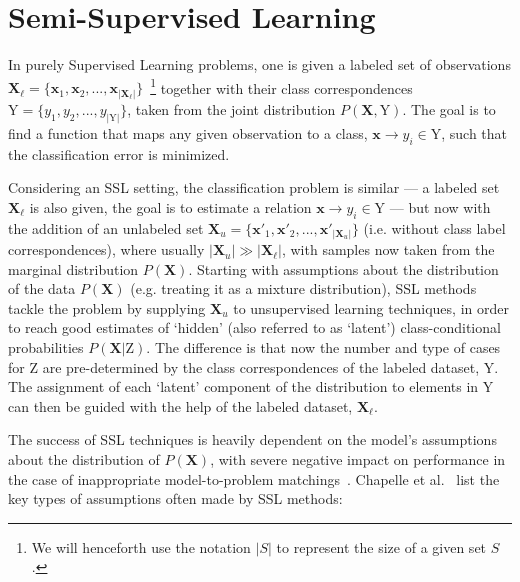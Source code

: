 \section{Semi-Supervised Learning}
\label{subsec:semi-supervised}


In purely Supervised Learning problems, one is given a labeled set of observations $\textbf{X}_\ell = \{\textbf{x}_1, \textbf{x}_2, ..., \textbf{x}_{|\textbf{X}_\ell|}\}$~\footnote{We will henceforth use the notation $|S|$ to represent the size of a given set $S$.} together with their class correspondences 
$\text{Y} = \{y_1, y_2, ..., y_{|\text{Y}|}\}$, taken from the joint distribution $P(\textbf{X}, \text{Y})$. The goal is to 
find a function that maps any given observation to a class, $\textbf{x} \rightarrow y_i \in \text{Y}$, such that 
the classification error is minimized.\vertbreak

Considering an SSL setting, the classification 
problem is similar --- a labeled set $\textbf{X}_\ell$ is also given, the goal is to estimate a 
relation $\textbf{x} \rightarrow y_i \in \text{Y}$ --- but now with the addition of an 
unlabeled set $\textbf{X}_u = \{\textbf{x}'_1, \textbf{x}'_2, ..., \textbf{x}'_{|\textbf{X}_u|}\}$ (i.e. without class label correspondences), where 
usually $|\textbf{X}_u| \gg |\textbf{X}_\ell|$, with samples now taken from 
the marginal distribution $P(\textbf{X})$. Starting with assumptions about the 
distribution of the data $P(\textbf{X})$ (e.g. treating it as a mixture distribution), SSL methods tackle the problem 
by supplying $\textbf{X}_u$ to unsupervised learning techniques, in order to 
reach good estimates of `hidden' (also referred to as `latent') class-conditional probabilities 
$P(\textbf{X}|\text{Z})$. The difference is that 
now the number and type of cases for Z are pre-determined by the 
class correspondences of the labeled dataset, $\text{Y}$. The assignment of 
each `latent' component of the distribution to elements in $\text{Y}$ can then be guided with 
the help of the labeled dataset, $\textbf{X}_\ell$.\vertbreak 

The success of 
SSL techniques is heavily dependent on the model's 
assumptions about the distribution of $P(\textbf{X})$, with severe negative impact on 
performance in the case of inappropriate model-to-problem 
matchings~\cite{zhu2009introduction,zhu05survey}. 
Chapelle et al.~\cite{chapelle2010semi} list the key types of assumptions often 
made by SSL methods:

